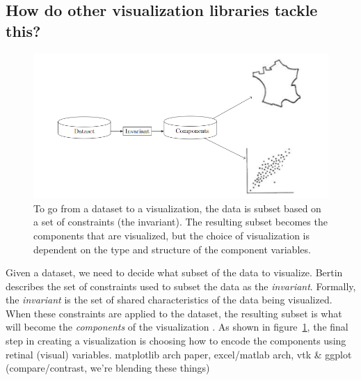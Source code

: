 \documentclass[../main.tex]{subfiles}
\begin{document}
\subsection{How do other visualization libraries tackle this?}
\begin{figure}[h!]
\includegraphics[width=\textwidth]{figures/intro/flowchart.png} 
\caption{To go from a dataset to a visualization, the data is subset based on a set of constraints (the invariant). The resulting subset becomes the components that are visualized, but the choice of visualization is dependent on the type and structure of the component variables.}
\label{fig:flowchart}
\end{figure}

Given a dataset, we need to decide what subset of the data to visualize. Bertin describes the set of constraints used to subset the data as the \textit{invariant}. Formally, the \textit{invariant} is the set of shared characteristics of the data being visualized. When these constraints are applied to the dataset, the resulting subset is what will become the \textit{components} of the visualization \cite{bertinSemiologyGraphicsDiagrams2011a}. 
As shown in figure~\ref{fig:flowchart}, the final step in creating a visualization is choosing how to encode the
components using retinal (visual) variables.
matplotlib arch paper, excel/matlab arch, 
vtk \& ggplot (compare/contrast, we're blending these things) 
\end{document}
